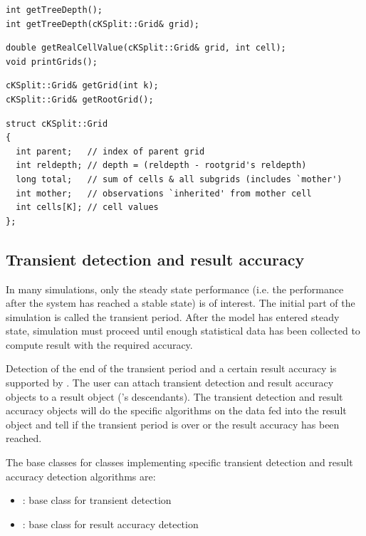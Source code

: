 \begin{verbatim}
int getTreeDepth();
int getTreeDepth(cKSplit::Grid& grid);
\end{verbatim}

\begin{verbatim}
double getRealCellValue(cKSplit::Grid& grid, int cell);
void printGrids();
\end{verbatim}

\begin{verbatim}
cKSplit::Grid& getGrid(int k);
cKSplit::Grid& getRootGrid();
\end{verbatim}

\begin{verbatim}
struct cKSplit::Grid
{
  int parent;   // index of parent grid
  int reldepth; // depth = (reldepth - rootgrid's reldepth)
  long total;   // sum of cells & all subgrids (includes `mother')
  int mother;   // observations `inherited' from mother cell
  int cells[K]; // cell values
};
\end{verbatim}



\subsection{Transient detection and result accuracy}

In many simulations, only the steady state performance (i.e.
the performance after the system has reached a stable state)
is of interest. The initial part of the simulation is called
the transient period. After the model has entered steady state,
simulation must proceed until enough statistical data has been
collected to compute result with the required accuracy.


Detection of the end of the transient period and a certain result
accuracy is supported by {\opp}. The user can attach transient
detection and result accuracy objects to a result object ('s
descendants). The transient detection and result accuracy objects will
do the specific algorithms on the data fed into the result object and
tell if the transient period is over or the result accuracy has been
reached.

The base classes for classes implementing specific transient
detection and result accuracy detection algorithms are:
\begin{itemize}
\item{: base class for transient detection}
\item{: base class for result accuracy detection}
\end{itemize}



